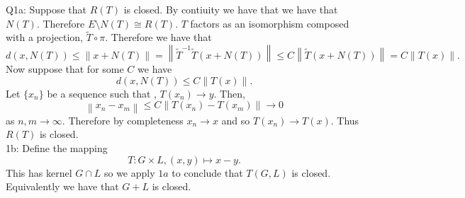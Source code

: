 \documentclass[letterpaper]{article}
\newcommand{\norm}[1]{\left\lVert#1\right\rVert}
\begin{document}
 \noindent Q1a: Suppose that $R(T)$ is closed. By contiuity we have that 
we have that $N(T)$. Therefore $E \setminus N(T) \cong R(T)$.
$T$ factors as an isomorphism composed with a projection, $\tilde{T}\circ \pi$. 
Therefore we have that $$d(x, N(T)) \leq \norm{x + N(T)} = \norm{\tilde{T} ^{-1} \tilde{T} (x+N(T))} \leq C \norm{\tilde{T} (x+ N(T))} = C\norm{T(x)}.$$
Now suppose that for some $C$ we have $$d(x,N(T)) \leq C\norm{T(x)}.$$ Let $\{x_n\}$ be a sequence such that ,
$T(x_n) \to y$. Then, $$\norm{x_n - x_m} \leq C \norm{T(x_n) - T(x_m)} \to 0$$ as $n,m \to \infty$. 
Therefore by completeness $x_n \to x$ and so $T(x_n) \to T(x)$. Thus $R(T)$ is closed. 
\newline \\ 1b: Define the mapping $$T: G \times L ,  (x,y) \mapsto x-y.$$ This has kernel $G\cap L$ so we apply $1a$ to conclude that $T(G,L)$ is closed. 
Equivalently we have that $G+L$ is closed.  
 
\end{document}
